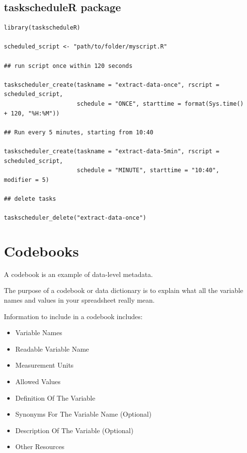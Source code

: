 \documentclass[
  letterpaper,
  DIV=11,
  numbers=noendperiod]{scrreprt}
\providecommand{\tightlist}{%
  \setlength{\itemsep}{0pt}\setlength{\parskip}{0pt}}\usepackage{longtable,booktabs,array}
\begin{document}
\section*{taskscheduleR package}\label{taskscheduler-package}


\begin{verbatim}
library(taskscheduleR)

scheduled_script <- "path/to/folder/myscript.R"

## run script once within 120 seconds

taskscheduler_create(taskname = "extract-data-once", rscript = scheduled_script,
                     schedule = "ONCE", starttime = format(Sys.time() + 120, "%H:%M"))

## Run every 5 minutes, starting from 10:40

taskscheduler_create(taskname = "extract-data-5min", rscript = scheduled_script,
                     schedule = "MINUTE", starttime = "10:40", modifier = 5)

## delete tasks

taskscheduler_delete("extract-data-once")
\end{verbatim}


\chapter*{Codebooks}\label{codebooks}


A codebook is an example of data-level metadata.

The purpose of a codebook or data dictionary is to explain what all the
variable names and values in your spreadsheet really mean.

Information to include in a codebook includes:

\begin{itemize}
\tightlist
\item
  Variable Names
\item
  Readable Variable Name
\item
  Measurement Units
\item
  Allowed Values
\item
  Definition Of The Variable
\item
  Synonyms For The Variable Name (Optional)
\item
  Description Of The Variable (Optional)
\item
  Other Resources
\end{itemize}
\end{document}
